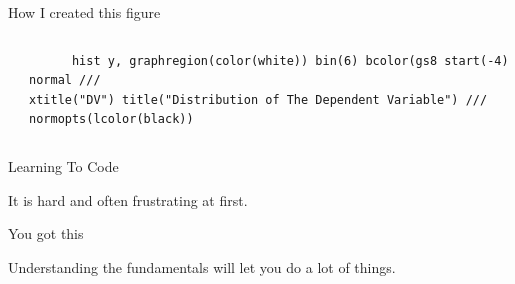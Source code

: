 \documentclass[shownotes,12pt, aspectratio=169]{beamer}
\newenvironment{wideitemize}{\itemize\addtolength{\itemsep}{10pt}}{\enditemize}
\begin{document}
\begin{frame}[t]{How I created this figure}
\begin{columns}
\begin{column}[T]{0.5\textwidth}
\end{column}
\hfill
\begin{column}{0.5\textwidth}
    \begin{verbatim}
      hist y, graphregion(color(white)) bin(6) bcolor(gs8 start(-4) normal ///
xtitle("DV") title("Distribution of The Dependent Variable") ///
normopts(lcolor(black))
    \end{verbatim}
\end{column}
\end{columns}
\end{frame}

\begin{frame}[t]{Learning To Code}
  \begin{wideitemize}
  \item It is hard and often frustrating at first.
  \pause
  \item You got this
  \item Understanding the fundamentals will let you do a lot of things.
  \end{wideitemize}
\end{frame}
\end{document}
